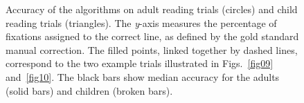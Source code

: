 \documentclass[doc,biblatex]{apa7}
\begin{document}
	\begin{figure}
	\vspace*{2pt}
	\caption{Accuracy of the algorithms on adult reading trials (circles) and child reading trials (triangles). The \textit{y}-axis measures the percentage of fixations assigned to the correct line, as defined by the gold standard manual correction. The filled points, linked together by dashed lines, correspond to the two example trials illustrated in Figs.~\ref{fig09} and~\ref{fig10}. The black bars show median accuracy for the adults (solid bars) and children (broken bars).}
	\label{fig08}
	\end{figure}
\end{document}
